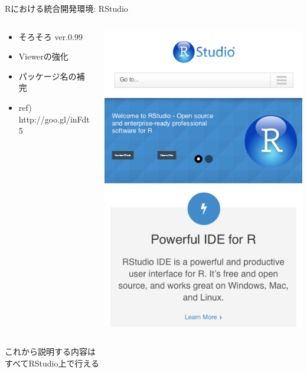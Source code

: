 \documentclass[ignorenonframetext,]{beamer}
\begin{document}
\begin{frame}{Rにおける統合開発環境: RStudio}

\begin{columns}[T]
  \begin{column}[T]{6cm}
    \begin{itemize}
      \item そろそろ ver.0.99
      \item Viewerの強化
      \item パッケージ名の補完
      \item \scriptsize{ref) \faLink http://goo.gl/inFdt5}
    \end{itemize}
  \end{column}
  \begin{column}[T]{4cm}
    \includegraphics[scale = 0.25]{images/webshot_rstudio_com.png}
  \end{column}
\end{columns}

\large{\faHandLeft これから説明する内容は\\すべてRStudio上で行える}

\end{frame}
\end{document}
